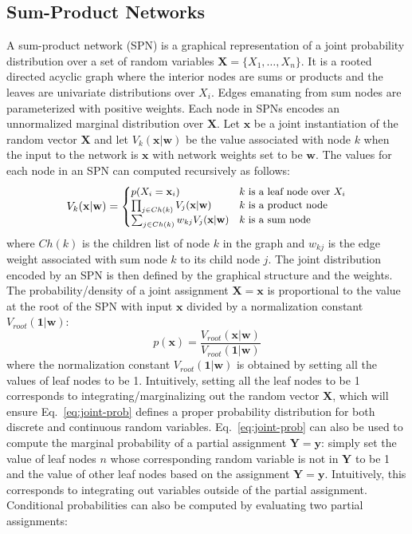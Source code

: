 \documentclass{article} %
\theoremstyle{definition}
\begin{document}
\subsection{Sum-Product Networks}
A sum-product network (SPN) is a graphical representation of a joint probability distribution over a set of random variables $\mathbf{X} = \{X_1, \ldots, X_n\}$. It is a rooted directed acyclic graph where the interior nodes are sums or products and the leaves are univariate distributions over $X_i$. Edges emanating from sum nodes are parameterized with positive weights. Each node in SPNs encodes an unnormalized marginal distribution over $\mathbf{X}$. Let $\mathbf{x}$ be a joint instantiation of the random vector $\mathbf{X}$ and let $V_k(\mathbf{x}|\mathbf{w})$ be the value associated with node $k$ when the input to the network is $\mathbf{x}$ with network weights set to be $\mathbf{w}$. The values for each node in an SPN can computed recursively as follows:
\begin{equation}
\small
\label{eq:network-eval}
V_k(\mathbf{x}|\mathbf{w}) = 
\begin{cases}
p(X_i = \mathbf{x}_i) & \text{$k$ is a leaf node over $X_i$} \\
\prod_{j \in Ch(k)} V_j(\mathbf{x}|\mathbf{w}) & \text{$k$ is a product node} \\
\sum_{j\in Ch(k)} w_{kj} V_j(\mathbf{x}|\mathbf{w}) & \text{$k$ is a sum node}
\end{cases} 
\end{equation}
where $Ch(k)$ is the children list of node $k$ in the graph and $w_{kj}$ is the edge weight associated with sum node $k$ to its child node $j$.
The joint distribution encoded by an SPN is then defined by the graphical structure and the weights. The probability/density of a joint assignment $\mathbf{X}=\mathbf{x}$ is proportional to the value at the root of the SPN with input $\mathbf{x}$ divided by a normalization constant $V_{root}(\mathbf{1}|\mathbf{w})$:
\begin{equation}
\label{eq:joint-prob}
p(\mathbf{x}) = \frac{V_{root}(\mathbf{x}|\mathbf{w})}{V_{root}(\mathbf{1}|\mathbf{w})}
\end{equation}
where the normalization constant $V_{root}(\mathbf{1}|\mathbf{w})$ is obtained by setting all the values of leaf nodes to be 1. Intuitively, setting all the leaf nodes to be 1 corresponds to integrating/marginalizing out the random vector $\mathbf{X}$, which will ensure Eq.~\ref{eq:joint-prob} defines a proper probability distribution for both discrete and continuous random variables. Eq.~\ref{eq:joint-prob} can also be used to compute the marginal probability of a partial assignment $\mathbf{Y}=\mathbf{y}$: simply set the value of leaf nodes $n$ whose corresponding random variable is not in $\mathbf{Y}$ to be 1 and the value of other leaf nodes based on the assignment $\mathbf{Y} = \mathbf{y}$.  Intuitively, this corresponds to integrating out variables outside of the partial assignment. Conditional probabilities can also be computed by evaluating two partial assignments:
\end{document}
